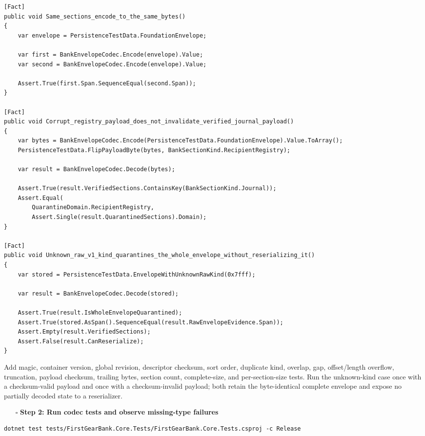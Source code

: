 \documentclass[
  10pt,
  letterpaper,
]{article}
\providecommand{\tightlist}{%
  \setlength{\itemsep}{0pt}\setlength{\parskip}{0pt}}
\begin{document}
\begin{lstlisting}
[Fact]
public void Same_sections_encode_to_the_same_bytes()
{
    var envelope = PersistenceTestData.FoundationEnvelope;

    var first = BankEnvelopeCodec.Encode(envelope).Value;
    var second = BankEnvelopeCodec.Encode(envelope).Value;

    Assert.True(first.Span.SequenceEqual(second.Span));
}

[Fact]
public void Corrupt_registry_payload_does_not_invalidate_verified_journal_payload()
{
    var bytes = BankEnvelopeCodec.Encode(PersistenceTestData.FoundationEnvelope).Value.ToArray();
    PersistenceTestData.FlipPayloadByte(bytes, BankSectionKind.RecipientRegistry);

    var result = BankEnvelopeCodec.Decode(bytes);

    Assert.True(result.VerifiedSections.ContainsKey(BankSectionKind.Journal));
    Assert.Equal(
        QuarantineDomain.RecipientRegistry,
        Assert.Single(result.QuarantinedSections).Domain);
}

[Fact]
public void Unknown_raw_v1_kind_quarantines_the_whole_envelope_without_reserializing_it()
{
    var stored = PersistenceTestData.EnvelopeWithUnknownRawKind(0x7fff);

    var result = BankEnvelopeCodec.Decode(stored);

    Assert.True(result.IsWholeEnvelopeQuarantined);
    Assert.True(stored.AsSpan().SequenceEqual(result.RawEnvelopeEvidence.Span));
    Assert.Empty(result.VerifiedSections);
    Assert.False(result.CanReserialize);
}
\end{lstlisting}

Add magic, container version, global revision, descriptor checksum, sort
order, duplicate kind, overlap, gap, offset/length overflow, truncation,
payload checksum, trailing bytes, section count, complete-size, and
per-section-size tests. Run the unknown-kind case once with a
checksum-valid payload and once with a checksum-invalid payload; both
retain the byte-identical complete envelope and expose no partially
decoded state to a reserializer.

\begin{itemize}
\tightlist
\item[$\square$]
  \textbf{Step 2: Run codec tests and observe missing-type failures}
\end{itemize}

\begin{lstlisting}
dotnet test tests/FirstGearBank.Core.Tests/FirstGearBank.Core.Tests.csproj -c Release
\end{lstlisting}
\end{document}
